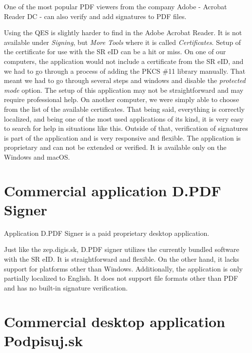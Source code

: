 \documentclass[thesismargins, english, thesislinespacing, onelinechapterstyle, upjsfrontpage]{rnthesis}
\begin{document}
One of the most popular PDF viewers from the company Adobe - Acrobat Reader DC - can also verify and add signatures to PDF files.


Using the QES is slightly harder to find in the Adobe Acrobat Reader.
It is not available under \textit{Signing}, but \textit{More Tools} where it is called \textit{Certificates}.
Setup of the certificate for use with the SR eID can be a hit or miss.
On one of our computers, the application would not include a certificate from the SR eID, and we had to go through a process of adding the PKCS \#11 library manually.
That meant we had to go through several steps and windows and disable the \textit{protected mode} option.
The setup of this application may not be straightforward and may require professional help.
On another computer, we were simply able to choose from the list of the available certificates.
That being said, everything is correctly localized, and being one of the most used applications of its kind, it is very easy to search for help in situations like this.
Outside of that, verification of signatures is part of the application and is very responsive and flexible.
The application is proprietary and can not be extended or verified.
It is available only on the Windows and macOS.

\section{Commercial application D.PDF Signer}

Application D.PDF Signer is a paid proprietary desktop application.


Just like the zep.digis.sk, D.PDF signer utilizes the currently bundled software with the SR eID.
It is straightforward and flexible.
On the other hand, it lacks support for platforms other than Windows.
Additionally, the application is only partially localized to English.
It does not support file formats other than PDF and has no built-in signature verification.

\section{Commercial desktop application Podpisuj.sk}
\end{document}
